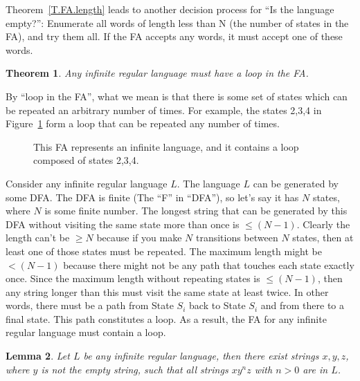 \documentclass[letterpaper,12pt,openany,reqno]{book}%
\newcommand{\fanonterminalnode}[2] {\node at (#1) (#2) [circle, draw, minimum size=24pt] {#2};}
\newcommand{\fatransition}[3] {\draw [->] (#1) -- (#2) node [midway, above] {#3};}
\newcommand{\faarctransition}[5] {\draw [->] (#1) to[out=#4, in=#5] node  [midway, above] {#3} (#2) ;}
\newtheorem{theorem}{Theorem}
\newtheorem{lemma}[theorem]{Lemma}
\begin{document}
Theorem~\ref{T.FA.length} leads to another decision process for ``Is the language empty?'': Enumerate all words of length less than N (the number of states in the FA), and try them all. If the FA accepts any words, it must accept one of these words.

\begin{theorem}
Any infinite regular language must have a loop in the FA.
\end{theorem}
By ``loop in the FA'', what we mean is that there is some set of states which can be repeated an arbitrary number of times. For example, the states 2,3,4 in Figure~\ref{F.FA.loop} form a loop that can be repeated any number of times. 
\begin{figure}[hbt]
\centering
{}
\caption[FA with a loop]{This FA represents an infinite language, and it contains a loop composed of states 2,3,4.}
\label{F.FA.loop}
\end{figure}
Consider any infinite regular language $L$. The language $L$ can be generated by some DFA. The DFA is finite (The ``F'' in ``DFA''), so let's say it has $N$ states, where $N$ is some finite number. The longest string that can be generated by this DFA without visiting the same state more than once is $\le (N-1)$. Clearly the length can't be $\ge N$ because if you make $N$ transitions between $N$ states, then at least one of those states must be repeated. The maximum length might be $< (N-1)$ because there might not be any path that touches each state exactly once. Since the maximum length without repeating states is $\le (N-1)$, then any string longer than this must visit the same state at least twice. In other words, there must be a path from State $S_i$ back to State $S_i$ and from there to a final state. This path constitutes a loop. As a result, the FA for any infinite regular language must contain a loop.

\begin{lemma}
\label{T.RL.pumping.lemma}
Let $L$ be any infinite regular language, then there exist strings $x,y,z$, where $y$ is not the empty string, such that all strings $x y^n z$ with $n>0$ are in $L$.
\end{lemma}
\end{document}

